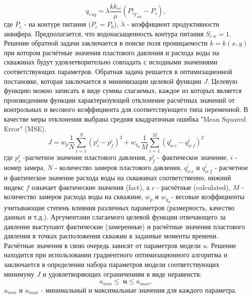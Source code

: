 \documentclass{article}
\begin{document}
\begin{equation} \label{qaq}
q_{i\:aq} = \lambda \frac{kk_{ri}}{\mu}(P|_{\Gamma_{out}}-P_c),
\end{equation}
где $P_{c}$ - на контуре питания ($P_c = P_0$), $\lambda$ - коэффициент продуктивности аквифера. Предполагается, что водонасыщенность контура питания $S_{c\:w} = 1$.
Решение обратной задачи заключается в поиске поля проницаемости $k = k(x,y)$ при котором расчётные значения пластового давления и расхода воды на скважинах будут удовлетворительно совпадать с исходными значениями соответствующих параметров. Обратная задача решается в оптимизационной постановке, которая заключается в минимизации целевой функции $J$. Целевую функцию можно записать в виде суммы слагаемых, каждое из которых является произведением функции характеризующей отклонение расчётных значений от контрольных и весового коэффициента для соответствующего типа переменной. В качестве меры отклонения выбрана средняя квадратичная ошибка "Mean Squared Error" (MSE). 
\begin{equation} \label{mse}
	J=w_p\frac{1}{N}\sum_{i=1}^N{\left(p_c^i-p_f^i\right)^2}+w_{q_w}\frac{1}{M}\sum_{i=1}^M{\left(q_{w\:c}^i-q_{w\:f}^i\right)^2}
\end{equation}
где $p_c^i$ -расчетное значение пластового давления, $p_f^i$ - фактическое значение, $i$ - номер замера, $N$ - количество замеров пластового давления, $q_{w\:c}^i$ и $q_{w\:f}^i$ - расчетное и фактическое значение расхода воды на скважинах соответственно, нижний индекс $f$ означает фактические значения (fact), а $c$ - расчётные (calculated), $M$ - количество замеров расхода воды на скважине, $w_p$ и $w_{q_w}$- весовые коэффициенты учитывающие степень влияния различных параметров (размерность, качество данных и т.д.). Аргументами слагаемого целевой функции отвечающего за давление выступают фактические (замеренные) и расчётные значения пластового давления в точках расположения скважин в заданные моменты времени.  
 Расчётные значения в свою очередь зависят от параметров модели $u$. Решение находится при использовании градиентного оптимизационного алгоритма и заключается в определении набора параметров модели соответствующих минимуму $J$ и удовлетворяющих ограничениям в виде неравенств:
\begin{equation*}
u_{min}\leq\ \boldsymbol{u}\leq u_{max},
\end{equation*}
$u_{min}$ и $u_{max}$ - минимальный и максимальные значения для каждого параметра.
\end{document}
